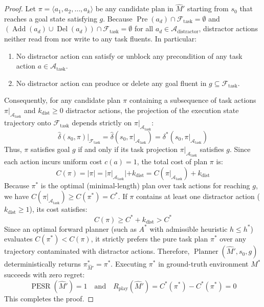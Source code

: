 \documentclass[11pt,a4paper]{article}
\theoremstyle{definition}
\theoremstyle{remark}
\begin{document}
\begin{proof}
Let $\pi = \langle a_1, a_2, \dots, a_k \rangle$ be any candidate plan in $\widehat{M}'$ starting from $s_0$ that reaches a goal state satisfying $g$.
Because $\operatorname{Pre}(a_d) \cap \mathcal{F}_{\text{task}} = \emptyset$ and $(\operatorname{Add}(a_d) \cup \operatorname{Del}(a_d)) \cap \mathcal{F}_{\text{task}} = \emptyset$ for all $a_d \in \mathcal{A}_{\text{distractor}}$, distractor actions neither read from nor write to any task fluents. In particular:
\begin{enumerate}
    \item No distractor action can satisfy or unblock any precondition of any task action $a \in \mathcal{A}_{\text{task}}$.
    \item No distractor action can produce or delete any goal fluent in $g \subseteq \mathcal{F}_{\text{task}}$.
\end{enumerate}
Consequently, for any candidate plan $\pi$ containing a subsequence of task actions $\pi|_{\mathcal{A}_{\text{task}}}$ and $k_{\text{dist}} \ge 0$ distractor actions, the projection of the execution state trajectory onto $\mathcal{F}_{\text{task}}$ depends strictly on $\pi|_{\mathcal{A}_{\text{task}}}$:
\begin{equation}
    \widehat{\delta}(s_0, \pi)|_{\mathcal{F}_{\text{task}}} = \widehat{\delta}(s_0, \pi|_{\mathcal{A}_{\text{task}}}) = \delta^*(s_0, \pi|_{\mathcal{A}_{\text{task}}})
\end{equation}
Thus, $\pi$ satisfies goal $g$ if and only if its task projection $\pi|_{\mathcal{A}_{\text{task}}}$ satisfies $g$.
Since each action incurs uniform cost $c(a) = 1$, the total cost of plan $\pi$ is:
\begin{equation}
    C(\pi) = |\pi| = |\pi|_{\mathcal{A}_{\text{task}}}| + k_{\text{dist}} = C(\pi|_{\mathcal{A}_{\text{task}}}) + k_{\text{dist}}
\end{equation}
Because $\pi^*$ is the optimal (minimal-length) plan over task actions for reaching $g$, we have $C(\pi|_{\mathcal{A}_{\text{task}}}) \ge C(\pi^*) = C^*$.
If $\pi$ contains at least one distractor action ($k_{\text{dist}} \ge 1$), its cost satisfies:
\begin{equation}
    C(\pi) \ge C^* + k_{\text{dist}} > C^*
\end{equation}
Since an optimal forward planner (such as $A^*$ with admissible heuristic $h \le h^*$) evaluates $C(\pi^*) < C(\pi)$, it strictly prefers the pure task plan $\pi^*$ over any trajectory contaminated with distractor actions.
Therefore, $\operatorname{Planner}(\widehat{M}', s_0, g)$ deterministically returns $\pi^*_{\widehat{M}'} = \pi^*$.
Executing $\pi^*$ in ground-truth environment $M^*$ succeeds with zero regret:
\begin{equation}
    \operatorname{PESR}(\widehat{M}') = 1 \quad \text{and} \quad R_{\text{play}}(\widehat{M}') = C^*(\pi^*) - C^*(\pi^*) = 0
\end{equation}
This completes the proof.
\end{proof}
\end{document}
